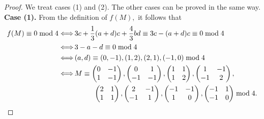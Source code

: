 \documentclass[12pt]{article}
\theoremstyle{definition}
\numberwithin{equation}{section}
\numberwithin{theorem}{section}
\begin{document}
\begin{proof}
We treat cases (1) and (2). The other cases can be proved in the same way. 
\newline
{\bf Case (1).}
From the definition of $f(M),$ it follows that 
\begin{align*}
f(M)\equiv 0 \bmod{4}
\Longleftrightarrow&\, 
3c+\frac13(a+d)c+\frac43bd\equiv 3c-(a+d)c\equiv 0 \bmod{4}  \\
\Longleftrightarrow&\, 
3-a-d\equiv 0 \bmod{4} \\
\Longleftrightarrow&\, 
(a,d)\equiv (0,-1), (1,2), (2,1), (-1,0) \bmod{4}  \\
\Longleftrightarrow&\, 
M
\equiv
\begin{pmatrix}
0 & -1 \\
1 & -1
\end{pmatrix}, 
\begin{pmatrix}
0 & 1 \\
-1 & -1
\end{pmatrix}, 
\begin{pmatrix}
1 & 1 \\
1 & 2
\end{pmatrix}, 
\begin{pmatrix}
1 & -1 \\
-1 & 2
\end{pmatrix},  \\
&\hspace{10mm}
\begin{pmatrix}
2 & 1 \\
1 & 1
\end{pmatrix}, 
\begin{pmatrix}
2 & -1 \\
-1 & 1
\end{pmatrix}, 
\begin{pmatrix}
-1 & -1 \\
1 & 0
\end{pmatrix}, 
\begin{pmatrix}
-1 & 1 \\
-1 & 0
\end{pmatrix} \bmod{4}. 
\end{align*}

\end{proof}
\end{document}
